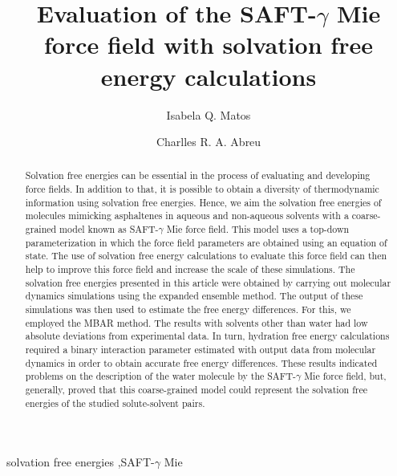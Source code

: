 \documentclass[final,12p,times,twocolumn]{elsarticle}
\begin{document}
	
	\begin{frontmatter}
		
		\title{Evaluation of the SAFT-$\gamma$ Mie force field with solvation free energy calculations}%
		
		\author{Isabela Q. Matos}
		\author{Charlles R. A. Abreu }
		\address{Chemical Engineering Department, Escola de Qu\'{\i}mica, Universidade Federal do Rio de Janeiro, Av. Athos da Silveira Ramos 149, Rio de Janeiro, RJ 21941-909, Brazil}
		
		
		\begin{abstract}
			Solvation free energies can be essential in the process of evaluating and developing force fields. In addition to that, it is possible to obtain a diversity of thermodynamic information using solvation free energies. Hence, we aim the solvation free energies of molecules mimicking asphaltenes in aqueous and non-aqueous solvents with a coarse-grained model known as SAFT-$\gamma$ Mie force field. This model uses a top-down parameterization in which the force field parameters are obtained using an equation of state. The use of solvation free energy calculations to evaluate this force field can then help to improve this force field and increase the scale of these simulations. The solvation free energies presented in this article were obtained by carrying out molecular dynamics simulations using the expanded ensemble method. The output of these simulations was then used to estimate the free energy differences. For this, we employed the MBAR method. The results with solvents other than water had low absolute deviations from experimental data. In turn, hydration free energy calculations required a binary interaction parameter estimated with output data from molecular dynamics in order to obtain accurate free energy differences. These results indicated problems on the description of the water molecule by the SAFT-$\gamma$ Mie force field, but, generally, proved that this coarse-grained model could represent the solvation free energies of the studied solute-solvent pairs.
		\end{abstract}
		
		
		
		\begin{keyword}
			solvation free energies \sep SAFT-$\gamma$ Mie 
		\end{keyword}
		
	\end{frontmatter}
	
\end{document}

